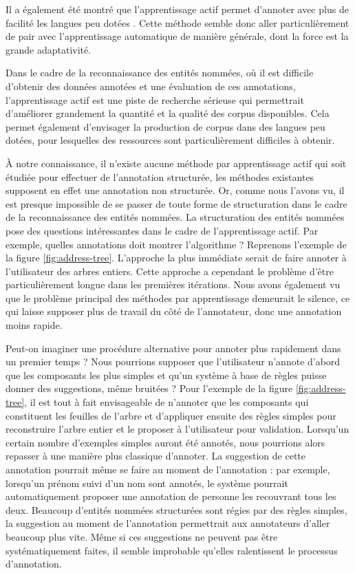 \documentclass[12pt,a4paper,times,twoside,openright]{report}
\begin{document}
Il a également été montré que l'apprentissage actif permet d'annoter avec plus de facilité les langues peu dotées \citep{garrette2013real}. Cette méthode semble donc aller particulièrement de pair avec l'apprentissage automatique de manière générale, dont la force est la grande adaptativité.

Dans le cadre de la reconnaissance des entités nommées, où il est difficile d'obtenir des données annotées et une évaluation de ces annotations, l'apprentissage actif est une piste de recherche sérieuse qui permettrait d'améliorer grandement la quantité et la qualité des corpus disponibles. Cela permet également d'envisager la production de corpus dans des langues peu dotées, pour lesquelles des ressources sont particulièrement difficiles à obtenir.

À notre connaissance, il n'existe aucune méthode par apprentissage actif qui soit étudiée pour effectuer de l'annotation structurée, les méthodes existantes supposent en effet une annotation non structurée. Or, comme nous l'avons vu, il est presque impossible de se passer de toute forme de structuration dans le cadre de la reconnaissance des entités nommées. La structuration des entités nommées pose des questions intéressantes dans le cadre de l'apprentissage actif. Par exemple, quelles annotations doit montrer l'algorithme ? Reprenons l'exemple de la figure \ref{fig:address-tree}. L'approche la plus immédiate serait de faire annoter à l'utilisateur des arbres entiers. Cette approche a cependant le problème d'être particulièrement longue dans les premières itérations. Nous avons également vu que le problème principal des méthodes par apprentissage demeurait le silence, ce qui laisse supposer plus de travail du côté de l'annotateur, donc une annotation moins rapide.

Peut-on imaginer une procédure alternative pour annoter plus rapidement dans un premier temps ? Nous pourrions supposer que l'utilisateur n'annote d'abord que les composants les plus simples et qu'un système à base de règles puisse donner des suggestions, même bruitées ? Pour l'exemple de la figure \ref{fig:address-tree}, il est tout à fait envisageable de n'annoter que les composants qui constituent les feuilles de l'arbre et d'appliquer ensuite des règles simples pour reconstruire l'arbre entier et le proposer à l'utilisateur pour validation. Lorsqu'un certain nombre d'exemples simples auront été annotés, nous pourrions alors repasser à une manière plus classique d'annoter. La suggestion de cette annotation pourrait même se faire au moment de l'annotation : par exemple, lorsqu'un prénom suivi d'un nom sont annotés, le système pourrait automatiquement proposer une annotation de personne les recouvrant tous les deux. Beaucoup d'entités nommées structurées sont régies par des règles simples, la suggestion au moment de l'annotation permettrait aux annotateurs d'aller beaucoup plus vite. Même si ces suggestions ne peuvent pas être systématiquement faites, il semble improbable qu'elles ralentissent le processus d'annotation.
\end{document}
